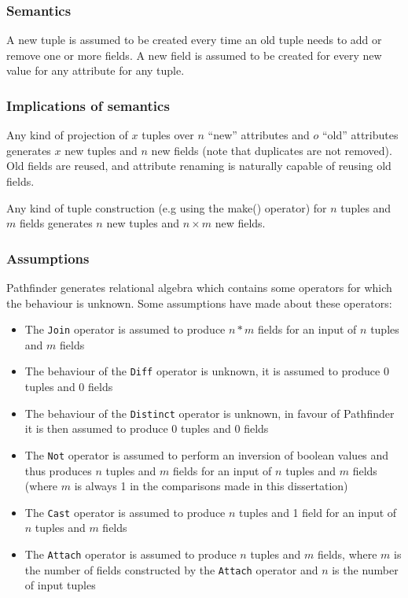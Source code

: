 \subsubsection{Semantics}
A new tuple is assumed to be created every time an old tuple needs to add or
remove one or more fields. A new field is assumed to be created for every new
value for any attribute for any tuple.

\subsubsection{Implications of semantics}
Any kind of projection of $x$ tuples over $n$ ``new'' attributes and $o$
``old'' attributes generates $x$ new tuples and $n$ new fields (note that
duplicates are not removed). Old fields are reused, and attribute renaming
is naturally capable of reusing old fields.

Any kind of tuple construction (e.g using the \textsf{make()} operator)
for $n$ tuples and $m$ fields generates $n$ new tuples and $n \times m$ new
fields.

\subsubsection{Assumptions}
Pathfinder generates relational algebra which contains some operators for which
the behaviour is unknown. Some assumptions have made about these operators:
\begin{itemize}
  \item The \texttt{Join} operator is assumed to produce $n*m$ fields for an
  input of $n$ tuples and $m$ fields
  \item The behaviour of the \texttt{Diff} operator is unknown, it is assumed
  to produce 0 tuples and 0 fields
  \item The behaviour of the \texttt{Distinct} operator is unknown, in favour
  of Pathfinder it is then assumed to produce 0 tuples and 0 fields
  \item The \texttt{Not} operator is assumed to perform an inversion of boolean
  values and thus produces $n$ tuples and $m$ fields for an input of $n$ tuples
  and $m$ fields (where $m$ is always 1 in the comparisons made in this dissertation)
  \item The \texttt{Cast} operator is assumed to produce $n$ tuples and 1
  field for an input of $n$ tuples and $m$ fields
  \item The \texttt{Attach} operator is assumed to produce $n$ tuples and $m$
  fields, where $m$ is the number of fields constructed by the \texttt{Attach}
  operator and $n$ is the number of input tuples
\end{itemize}

